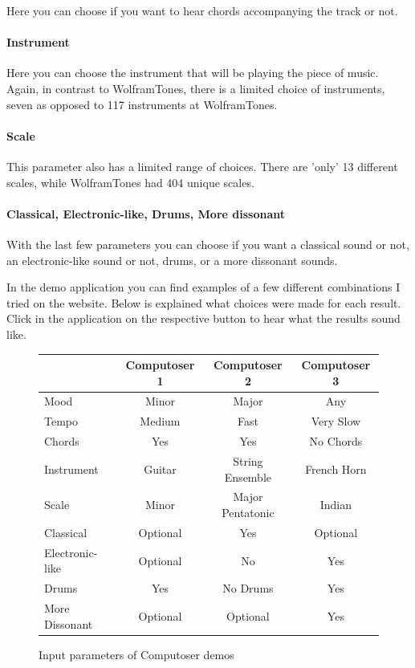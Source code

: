 \documentclass[12pt]{article}
\begin{document}
Here you can choose if you want to hear chords accompanying the track or not.

\paragraph{Instrument}

Here you can choose the instrument that will be playing the piece of music. Again, in contrast to WolframTones, there is a limited choice of instruments, seven as opposed to 117 instruments at WolframTones.

\paragraph{Scale}

This parameter also has a limited range of choices. There are 'only' 13 different scales, while WolframTones had 404 unique scales.

\paragraph{Classical, Electronic-like, Drums, More dissonant}

With the last few parameters you can choose if you want a classical sound or not, an electronic-like sound or not, drums, or a more dissonant sounds.
\newline

In the demo application you can find examples of a few different combinations I tried on the website. Below is explained what choices were made for each result. Click in the application on the respective button to hear what the results sound like.
\newline

\begin{figure}
\begin{tabular}[]{| l |  c | c | c |}
\hline
& Computoser 1 & Computoser 2 & Computoser 3 \\ \hline
Mood & Minor & Major & Any \\
Tempo & Medium & Fast & Very Slow \\
Chords & Yes & Yes & No Chords \\
Instrument & Guitar & String Ensemble & French Horn \\
Scale & Minor & Major Pentatonic & Indian \\
Classical & Optional & Yes & Optional \\
Electronic-like & Optional & No & Yes\\
Drums & Yes & No Drums & Yes \\
More Dissonant & Optional & Optional & Yes \\
\hline
\end{tabular}
\caption{Input parameters of Computoser demos}
\end{figure}
\end{document}
